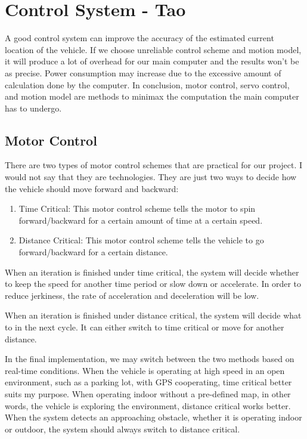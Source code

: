 \documentclass[compsoc,draftclsnofoot,onecolumn,10pt]{IEEEtran}
\begin{document}
\section{Control System - Tao}
A good control system can improve the accuracy of the estimated current location 
of the vehicle. If we choose unreliable control scheme and motion model, it will 
produce a lot of overhead for our main computer and the results won’t be as precise. 
Power consumption may increase due to the excessive amount of calculation done by 
the computer. In conclusion, motor control, servo control, and motion model are 
methods to minimax the computation the main computer has to undergo.

\subsection{Motor Control}
There are two types of motor control schemes that are practical for our project. 
I would not say that they are technologies. They are just two ways to decide 
how the vehicle should move forward and backward:
\begin{enumerate}
\item Time Critical: This motor control scheme tells the motor to spin 
forward/backward for a certain amount of time at a certain speed.
\item Distance Critical: This motor control scheme tells the vehicle to go 
forward/backward for a certain distance.
\end{enumerate}
When an iteration is finished under time critical, the system will decide whether 
to keep the speed for another time period or slow down or accelerate. In order 
to reduce jerkiness, the rate of acceleration and deceleration will be low.\par

When an iteration is finished under distance critical, the system will decide what 
to in the next cycle. It can either switch to time critical or move for another 
distance.\par

In the final implementation, we may switch between the two methods based on 
real-time conditions. When the vehicle is operating at high speed in an open 
environment, such as a parking lot, with GPS cooperating, time critical better 
suits my purpose. When operating indoor without a pre-defined map, in other words, 
the vehicle is exploring the environment, distance critical works better. When the 
system detects an approaching obstacle, whether it is operating indoor or outdoor, 
the system should always switch to distance critical.\par
\end{document}
